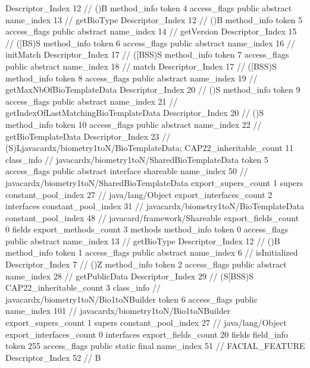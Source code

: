 {{{{{					Descriptor_Index	12		// ()B
				}
				method_info {
					token	4
					access_flags	public abstract
					name_index	13		// getBioType
					Descriptor_Index	12		// ()B
				}
				method_info {
					token	5
					access_flags	public abstract
					name_index	14		// getVersion
					Descriptor_Index	15		// ([BS)S
				}
				method_info {
					token	6
					access_flags	public abstract
					name_index	16		// initMatch
					Descriptor_Index	17		// ([BSS)S
				}
				method_info {
					token	7
					access_flags	public abstract
					name_index	18		// match
					Descriptor_Index	17		// ([BSS)S
				}
				method_info {
					token	8
					access_flags	public abstract
					name_index	19		// getMaxNbOfBioTemplateData
					Descriptor_Index	20		// ()S
				}
				method_info {
					token	9
					access_flags	public abstract
					name_index	21		// getIndexOfLastMatchingBioTemplateData
					Descriptor_Index	20		// ()S
				}
				method_info {
					token	10
					access_flags	public abstract
					name_index	22		// getBioTemplateData
					Descriptor_Index	23		// (S)Ljavacardx/biometry1toN/BioTemplateData;
				}
			}
			CAP22_inheritable_count	11
		}
		class_info {		// javacardx/biometry1toN/SharedBioTemplateData
			token	5
			access_flags	public abstract interface shareable
			name_index	50		// javacardx/biometry1toN/SharedBioTemplateData
			export_supers_count	1
			supers {
				constant_pool_index	27		// java/lang/Object
			}
			export_interfaces_count	2
			interfaces {
				constant_pool_index	31		// javacardx/biometry1toN/BioTemplateData
				constant_pool_index	48		// javacard/framework/Shareable
			}
			export_fields_count	0
			fields {
			}
			export_methods_count	3
			methods {
				method_info {
					token	0
					access_flags	public abstract
					name_index	13		// getBioType
					Descriptor_Index	12		// ()B
				}
				method_info {
					token	1
					access_flags	public abstract
					name_index	6		// isInitialized
					Descriptor_Index	7		// ()Z
				}
				method_info {
					token	2
					access_flags	public abstract
					name_index	28		// getPublicData
					Descriptor_Index	29		// (S[BSS)S
				}
			}
			CAP22_inheritable_count	3
		}
		class_info {		// javacardx/biometry1toN/Bio1toNBuilder
			token	6
			access_flags	public
			name_index	101		// javacardx/biometry1toN/Bio1toNBuilder
			export_supers_count	1
			supers {
				constant_pool_index	27		// java/lang/Object
			}
			export_interfaces_count	0
			interfaces {
			}
			export_fields_count	20
			fields {
			field_info {
				token	255
				access_flags	public static final
				name_index	51		// FACIAL_FEATURE
				Descriptor_Index	52		// B
}}}}}
